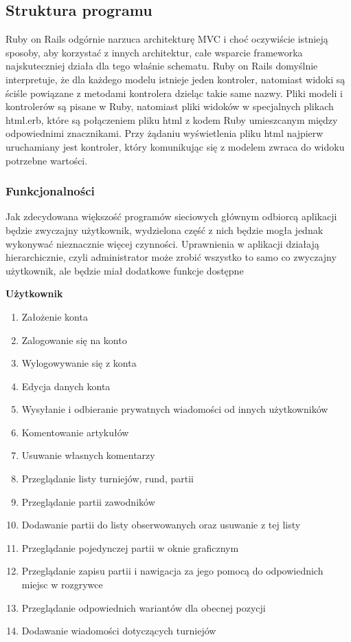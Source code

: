 \documentclass[12pt,leqno]{article}
\begin{document}
\subsection{Struktura programu}
Ruby on Rails odgórnie narzuca architekturę MVC i choć oczywiście istnieją sposoby, aby korzystać z innych architektur, całe wsparcie frameworka najskuteczniej działa dla tego właśnie schematu. Ruby on Rails domyślnie interpretuje, że dla każdego modelu istnieje jeden kontroler, natomiast widoki są ściśle powiązane z metodami kontrolera dzieląc takie same nazwy. Pliki modeli i kontrolerów są pisane w Ruby, natomiast pliki widoków w specjalnych plikach html.erb, które są połączeniem pliku html z kodem Ruby umieszcanym między odpowiednimi znacznikami. Przy żądaniu wyświetlenia pliku html najpierw uruchamiany jest kontroler, który komunikując się z modelem zwraca do widoku potrzebne wartości.  


\subsubsection{Funkcjonalności}
Jak zdecydowana większość programów sieciowych głównym odbiorcą aplikacji będzie zwyczajny użytkownik, wydzielona część z nich będzie mogła jednak wykonywać nieznacznie więcej czynności. Uprawnienia w aplikacji działają hierarchicznie, czyli administrator może zrobić wszystko to samo co zwyczajny użytkownik, ale będzie miał dodatkowe funkcje dostępne

{\bf Użytkownik }
\begin{enumerate}
\item Założenie konta
\item Zalogowanie się na konto
\item Wylogowywanie się z konta
\item Edycja danych konta
\item Wysyłanie i odbieranie prywatnych wiadomości od innych użytkowników
\item Komentowanie artykułów
\item Usuwanie własnych komentarzy
\item Przeglądanie listy turniejów, rund, partii
\item Przeglądanie partii zawodników
\item Dodawanie partii do listy obserwowanych oraz usuwanie z tej listy
\item Przeglądanie pojedynczej partii w oknie graficznym
\item Przeglądanie zapisu partii i nawigacja za jego pomocą do odpowiednich miejsc w rozgrywce
\item Przeglądanie odpowiednich wariantów dla obecnej pozycji
\item Dodawanie wiadomości dotyczących turniejów
\end{enumerate}
\end{document}
